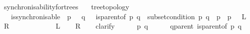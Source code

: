 \begin{isabellebody}
{}
\isamarkuptrue%
%
\endisatagdocument
{\isafolddocument}%
%
\isadelimdocument
%
\endisadelimdocument
{}\isamarkupfalse%
\ synchronisability{\isacharunderscore}{\kern0pt}for{\isacharunderscore}{\kern0pt}trees{\isacharcolon}{\kern0pt}\isanewline
\ \ \ {\isachardoublequoteopen}tree{\isacharunderscore}{\kern0pt}topology{\isachardoublequoteclose}\ \isanewline
\ \ \ {\isachardoublequoteopen}is{\isacharunderscore}{\kern0pt}synchronisable\ {\isasymlongleftrightarrow}\ {\isacharparenleft}{\kern0pt}{\isacharparenleft}{\kern0pt}{\isasymforall}p\ {\isasymin}\ {\isasymP}{\isachardot}{\kern0pt}\ {\isasymforall}q\ {\isasymin}\ {\isasymP}{\isachardot}{\kern0pt}\ {\isacharparenleft}{\kern0pt}{\isacharparenleft}{\kern0pt}is{\isacharunderscore}{\kern0pt}parent{\isacharunderscore}{\kern0pt}of\ p\ q{\isacharparenright}{\kern0pt}\ {\isasymlongrightarrow}\ {\isacharparenleft}{\kern0pt}{\isacharparenleft}{\kern0pt}subset{\isacharunderscore}{\kern0pt}condition\ p\ q{\isacharparenright}{\kern0pt}\ {\isasymand}\ {\isacharparenleft}{\kern0pt}{\isacharparenleft}{\kern0pt}{\isasymL}\isactrlsup {\isacharasterisk}{\kern0pt}{\isacharparenleft}{\kern0pt}p{\isacharparenright}{\kern0pt}{\isacharparenright}{\kern0pt}\ {\isacharequal}{\kern0pt}\ {\isacharparenleft}{\kern0pt}{\isasymL}\isactrlsup {\isacharasterisk}{\kern0pt}\isactrlsub {\isasymsqunion}\isactrlsub {\isasymsqunion}{\isacharparenleft}{\kern0pt}p{\isacharparenright}{\kern0pt}{\isacharparenright}{\kern0pt}{\isacharparenright}{\kern0pt}{\isacharparenright}{\kern0pt}\ {\isacharparenright}{\kern0pt}{\isacharparenright}{\kern0pt}{\isacharparenright}{\kern0pt}{\isachardoublequoteclose}\ {\isacharparenleft}{\kern0pt}\ {\isachardoublequoteopen}{\isacharquery}{\kern0pt}L\ {\isasymlongleftrightarrow}\ {\isacharquery}{\kern0pt}R{\isachardoublequoteclose}{\isacharparenright}{\kern0pt}\isanewline
\ \ \ \ \isanewline
%
\isadelimproof
%
\endisadelimproof
%
\isatagproof
{}\isamarkupfalse%
\ \isanewline
\ \ \isanewline
\ \ \isamarkupfalse%
\ {\isachardoublequoteopen}{\isacharquery}{\kern0pt}L{\isachardoublequoteclose}\isanewline
\ \ \isamarkupfalse%
\ {\isachardoublequoteopen}{\isacharquery}{\kern0pt}R{\isachardoublequoteclose}\isanewline
\ \ \isamarkupfalse%
\ clarify\isanewline
\ \ \ \ \isamarkupfalse%
\ p\ q\isanewline
\ \ \ \ \isamarkupfalse%
\ q{\isacharunderscore}{\kern0pt}parent{\isacharcolon}{\kern0pt}\ {\isachardoublequoteopen}is{\isacharunderscore}{\kern0pt}parent{\isacharunderscore}{\kern0pt}of\ p\ q{\isachardoublequoteclose}\isanewline

\end{isabellebody}

